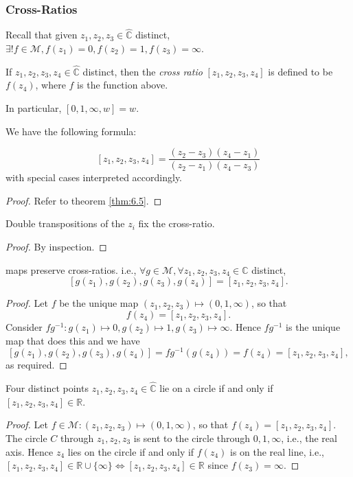 \documentclass[a4paper]{article}
\begin{document}
    \subsubsection{Cross-Ratios}
    Recall that given $z_1,z_2,z_3 \in \hat{\mathbb{C}}$ distinct, $ \exists !f\in \mathcal{M}, f(z_1)=0, f(z_2)=1,f(z_3)=\infty  $. 
    \begin{definition}
        If $z_1,z_2,z_3,z_4 \in \hat{\mathbb{C}}$ distinct, then the \textit{cross ratio} $ [z_1,z_2,z_3,z_4] $ is defined to be $f(z_4)$, where $f$ is the function above.

        In particular, $ [0,1,\infty,w]=w $.
    \end{definition}
    We have the following formula:
    \begin{proposition}
        \[
            [z_1,z_2,z_3,z_4] = \frac{(z_2-z_3)(z_4-z_1)}{(z_2-z_1)(z_4-z_3)}
        \]
        with special cases interpreted accordingly.
    \end{proposition}
    \begin{proof}
        Refer to theorem \ref{thm:6.5}.
    \end{proof}
    \begin{proposition}\label{prop:6.10}
        Double transpositions of the $z_i$ fix the cross-ratio.
    \end{proposition}
    \begin{proof}
        By inspection.
    \end{proof}
    \begin{theorem}\label{thm:6.11}
        \mobius maps preserve cross-ratios. i.e., $ \forall g\in \mathcal{M}, \forall z_1,z_2,z_3,z_4\in \hat{\mathbb{C}} $ distinct,
        \[
            [g(z_1),g(z_2),g(z_3),g(z_4)]=[z_1,z_2,z_3,z_4].
        \] 
    \end{theorem}
    \begin{proof}
        Let $f$ be the unique \mobius map $ (z_1,z_2,z_3)\mapsto (0,1,\infty ) $, so that 
        \[
            f(z_4)=[z_1,z_2,z_3,z_4].
        \]
        Consider $ fg^{-1}: g(z_1)\mapsto 0,g(z_2)\mapsto 1,g(z_3)\mapsto \infty  $. Hence $fg^{-1}$ is the unique map that does this and we have 
        \[
            [g(z_1),g(z_2),g(z_3),g(z_4)] = fg^{-1}(g(z_4))=f(z_4)=[z_1,z_2,z_3,z_4],
        \]
        as required.
    \end{proof}
    \begin{corollary}\label{col:6.12}
        Four distinct points $z_1,z_2,z_3,z_4\in \hat{\mathbb{C}}$ lie on a circle if and only if $[z_1,z_2,z_3,z_4]\in \mathbb{R}$.
    \end{corollary}
    \begin{proof}
        Let $f\in \mathcal{M}: (z_1,z_2,z_3)\mapsto (0,1,\infty )$, so that $ f(z_4)=[z_1,z_2,z_3,z_4] $. The circle $C$ through $z_1,z_2,z_3$ is sent to the circle through $0,1,\infty$, i.e., the real axis. Hence $z_4$ lies on the circle if and only if $f(z_4)$ is on the real line, i.e., $[z_1,z_2,z_3,z_4]\in \mathbb{R} \cup \{\infty\} \Leftrightarrow [z_1,z_2,z_3,z_4]\in \mathbb{R}$ since $f(z_3)=\infty$.
    \end{proof}
\end{document}
